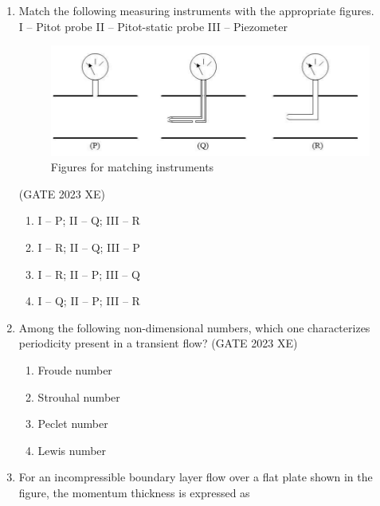 \documentclass[journal,12pt,onecolumn]{IEEEtran}
\begin{document}
\begin{enumerate}

\item Match the following measuring instruments with the appropriate figures.\\
I – Pitot probe \quad II – Pitot-static probe \quad III – Piezometer

\begin{figure}[htbp]
\centering
\includegraphics[width=0.8\columnwidth]{figs/B/fig1.png}
\caption{Figures for matching instruments}
\label{fig:figs/Bfig1.png}
\end{figure}
\hfill{(GATE 2023 XE)}

\begin{multicols}{2}
\begin{enumerate}
\item I – P; II – Q; III – R
\item I – R; II – Q; III – P
\item I – R; II – P; III – Q
\item I – Q; II – P; III – R
\end{enumerate}
\end{multicols}

\item Among the following non-dimensional numbers, which one characterizes periodicity
present in a transient flow?
\hfill{(GATE 2023 XE)}
\begin{multicols}{2}
\begin{enumerate}
\item Froude number
\item Strouhal number
\item Peclet number
\item Lewis number
\end{enumerate}
\end{multicols}

\item For an incompressible boundary layer flow over a flat plate shown in the figure, the
momentum thickness is expressed as


\end{enumerate}
\end{document}
